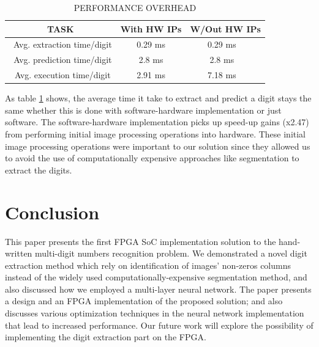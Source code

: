 \documentclass[sigconf]{acmart}
\theoremstyle{plain}
\theoremstyle{remark}
\begin{document}
\begin{table} [H] 
\caption{PERFORMANCE OVERHEAD} \label{tab:timing}
\begin{minipage}[b]{\linewidth}
\renewcommand{\arraystretch}{0.6}
\addtolength{\tabcolsep}{-2.7pt}
\renewcommand{\thefootnote}{\thempfootnote}
\renewcommand{\thempfootnote}{\fnsymbol{mpfootnote}}
\begin{center}
\begin{tabular}{ c | c | c }
 \textbf {TASK} & \textbf{With HW IPs} & \textbf{W/Out HW IPs} \\
\midrule
\midrule
\ Avg. extraction time/digit       &0.29 ms    &0.29 ms      \ \\
\ Avg. prediction time/digit       &2.8 ms     &2.8 ms       \ \\
\ Avg. execution time/digit        &2.91 ms    &7.18 ms      \ \\
\end{tabular}
\end{center}
\end{minipage}
\end{table}


As table \ref{tab:timing} shows, the average time it take to extract and predict a digit stays the same whether this is done with software-hardware implementation or just software. The software-hardware implementation picks up speed-up gains (x2.47) from performing initial image processing operations into hardware. These initial image processing operations were important to our solution since they allowed us to avoid the use of computationally expensive approaches like segmentation to extract the digits. 



\section{Conclusion} \label{sec:conclusion}

This paper presents the first FPGA SoC implementation solution to the hand-written multi-digit numbers recognition problem. We demonstrated  a novel digit extraction method which rely on identification of images' non-zeros columns instead of the widely used computationally-expensive segmentation method, and also discussed how we employed a multi-layer neural network. The paper presents a design and an FPGA implementation of the proposed solution; and also discusses various optimization techniques in the neural network implementation that lead to increased performance. Our future work will explore the possibility of implementing the digit extraction part on the FPGA. 




\end{document}
